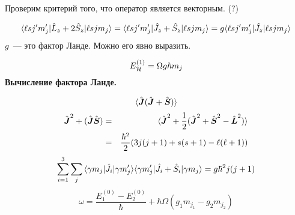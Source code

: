 Проверим критерий того, что оператор является векторным. (?)

$$
    \qtri{\l s j' m_j'}{\hat L_z + 2 \hat S_z}{\l s j m_j} =
\qtri{\l s j' m_j'}{\hat J_z + \hat S_z}{\l s j m_j} = g \qtri{\l s j' m_j'}{\hat J_z}{\l s j m_j}
$$
$g$~--- это фактор Ланде. Можно его явно выразить.

$$
    E_{\H}^{(1)} = \Omega g \hbar m_j
$$
\textbf{Вычисление фактора Ланде.}

$$
    \langle
    \hat{\bf J} (\hat{\bf J} + \hat{\bf S})
\rangle
$$
\begin{eqnarray*}
    \hat{\bf J}^2 + (\hat{\bf J} \hat{\bf S}) &=& \langle
    \hat{\bf J}^2 + \frac12 (\hat{\bf J}^2 + \hat{\bf S}^2 - \hat{\bf L}^2)
\rangle\\
&=& \dfrac{\hbar^2}{2} (3 j(j+1) + s(s+1) - \l(\l+1))
\end{eqnarray*}
$$
    \sum_{i=1}^{3} \sum_{j} \qtri{\gamma m_j}{\hat{J_i}}{\gamma m_j'}
\qtri{\gamma m_j'}{\hat J_i + \hat S_i}{\gamma m_j}
= g \hbar^2 j(j+1)
$$
$$
    \omega = \dfrac{E_1^{(0)} - E_2^{(0)}}{\hbar} + \hbar \Omega (g_1 m_{j_1} - g_2 m_{j_2})
$$